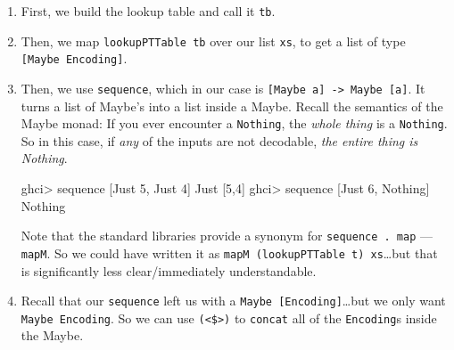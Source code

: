 \documentclass[]{article}
\newenvironment{Shaded}{\begin{snugshade}}{\end{snugshade}}
\newcommand{\DataTypeTok}[1]{\textcolor[rgb]{0.13,0.29,0.53}{#1}}
\newcommand{\DecValTok}[1]{\textcolor[rgb]{0.00,0.00,0.81}{#1}}
\newcommand{\FunctionTok}[1]{\textcolor[rgb]{0.00,0.00,0.00}{#1}}
\newcommand{\NormalTok}[1]{#1}
\begin{document}
\begin{enumerate}
\def\labelenumi{\arabic{enumi}.}
\item
  First, we build the lookup table and call it \texttt{tb}.
\item
  Then, we map \texttt{lookupPTTable\ tb} over our list \texttt{xs}, to get a
  list of type \texttt{{[}Maybe\ Encoding{]}}.
\item
  Then, we use \texttt{sequence}, which in our case is
  \texttt{{[}Maybe\ a{]}\ -\textgreater{}\ Maybe\ {[}a{]}}. It turns a list of
  Maybe's into a list inside a Maybe. Recall the semantics of the Maybe monad:
  If you ever encounter a \texttt{Nothing}, the \emph{whole thing} is a
  \texttt{Nothing}. So in this case, if \emph{any} of the inputs are not
  decodable, \emph{the entire thing is Nothing}.

\begin{Shaded}
\begin{Highlighting}[]
\NormalTok{ghci}\FunctionTok{>}\NormalTok{ sequence [}\DataTypeTok{Just} \DecValTok{5}\NormalTok{, }\DataTypeTok{Just} \DecValTok{4}\NormalTok{]}
\DataTypeTok{Just}\NormalTok{ [}\DecValTok{5}\NormalTok{,}\DecValTok{4}\NormalTok{]}
\NormalTok{ghci}\FunctionTok{>}\NormalTok{ sequence [}\DataTypeTok{Just} \DecValTok{6}\NormalTok{, }\DataTypeTok{Nothing}\NormalTok{]}
\DataTypeTok{Nothing}
\end{Highlighting}
\end{Shaded}

  Note that the standard libraries provide a synonym for
  \texttt{sequence\ .\ map} --- \texttt{mapM}. So we could have written it as
  \texttt{mapM\ (lookupPTTable\ t)\ xs}\ldots{}but that is significantly less
  clear/immediately understandable.
\item
  Recall that our \texttt{sequence} left us with a
  \texttt{Maybe\ {[}Encoding{]}}\ldots{}but we only want
  \texttt{Maybe\ Encoding}. So we can use \texttt{(\textless{}\$\textgreater{})}
  to \texttt{concat} all of the \texttt{Encoding}s inside the Maybe.
\end{enumerate}
\end{document}
